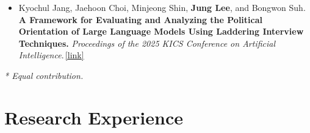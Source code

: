 \documentclass[letterpaper,10pt]{article}
\newcommand{\pub}[1]{\,\href{#1}{\small [link]}}
\let\oldsection\section
\renewcommand{\section}[1]{\needspace{8\baselineskip}\oldsection{#1}}
\newenvironment{plain}
  {\begin{itemize}[leftmargin=1.2em, itemsep=\PLAINSEP, parsep=0pt, topsep=\TOPSEP]}
  {\end{itemize}}
\newcommand{\me}{\textbf{Jung Lee}}   %
\begin{document}
\begin{plain}
  \item Kyochul Jang, Jaehoon Choi, Minjeong Shin, \me, and Bongwon Suh.
        \textbf{A Framework for Evaluating and Analyzing the Political Orientation of Large
        Language Models Using Laddering Interview Techniques.} \textit{Proceedings of the 2025 KICS
        Conference on Artificial Intelligence}.\pub{https://scholar.google.com/scholar?oi=bibs\&cluster=6252816665032242407\&btnI=1\&hl=ko}
\end{plain}
\vspace{0.3em}
{\small\textit{* Equal contribution.}}

\section{Research Experience}
\end{document}
